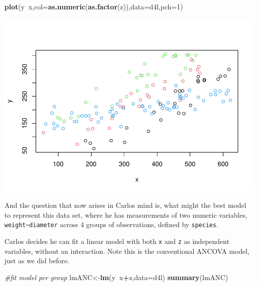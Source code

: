 \documentclass[
]{book}
\newenvironment{Shaded}{\begin{snugshade}}{\end{snugshade}}
\newcommand{\CommentTok}[1]{\textcolor[rgb]{0.56,0.35,0.01}{\textit{#1}}}
\newcommand{\DataTypeTok}[1]{\textcolor[rgb]{0.13,0.29,0.53}{#1}}
\newcommand{\DecValTok}[1]{\textcolor[rgb]{0.00,0.00,0.81}{#1}}
\newcommand{\KeywordTok}[1]{\textcolor[rgb]{0.13,0.29,0.53}{\textbf{#1}}}
\newcommand{\NormalTok}[1]{#1}
\newcommand{\OperatorTok}[1]{\textcolor[rgb]{0.81,0.36,0.00}{\textbf{#1}}}
\begin{document}
\begin{Shaded}
\begin{Highlighting}[]
\KeywordTok{plot}\NormalTok{(y}\OperatorTok{~}\NormalTok{x,}\DataTypeTok{col=}\KeywordTok{as.numeric}\NormalTok{(}\KeywordTok{as.factor}\NormalTok{(z)),}\DataTypeTok{data=}\NormalTok{d4l,}\DataTypeTok{pch=}\DecValTok{1}\NormalTok{)}
\end{Highlighting}
\end{Shaded}

\includegraphics{ECOMODbook_files/figure-latex/a11.20-1.pdf}

And the question that now arises in Carlos mind is, what might the best model to represent this data set, where he has measurements of two numeric variables, \texttt{weight\textasciitilde{}diameter} across 4 groups of observations, defined by \texttt{species}.

Carlos decides he can fit a linear model with both \texttt{x} and \texttt{z} as independent variables, without an interaction. Note this is the conventional ANCOVA model, just as we did before.

\begin{Shaded}
\begin{Highlighting}[]
\CommentTok{#fit model per group}
\NormalTok{lmANC<-}\KeywordTok{lm}\NormalTok{(y}\OperatorTok{~}\NormalTok{x}\OperatorTok{+}\NormalTok{z,}\DataTypeTok{data=}\NormalTok{d4l)}
\KeywordTok{summary}\NormalTok{(lmANC)}
\end{Highlighting}
\end{Shaded}
\end{document}
